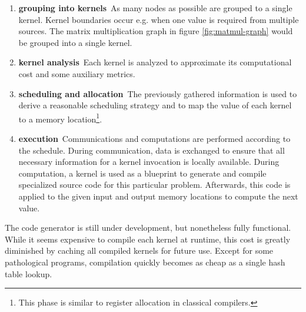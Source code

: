 \begin{enumerate}
\item \textbf{grouping into kernels}\, As many nodes as possible are
  grouped to a single kernel. Kernel boundaries occur e.g. when one value
  is required from multiple sources. The matrix multiplication graph in
  figure \ref{fig:matmul-graph} would be grouped into a single kernel.

\item \textbf{kernel analysis}\, Each kernel is analyzed to approximate its
  computational cost and some auxiliary metrics.

\item \textbf{scheduling and allocation}\, The previously gathered
  information is used to derive a reasonable scheduling strategy and to map
  the value of each kernel to a memory location\footnote{This phase is similar to
  register allocation in classical compilers.}.
\item \textbf{execution}\, Communications and computations are performed
  according to the schedule. During communication, data is exchanged to
  ensure that all necessary information for a kernel invocation is locally
  available. During computation, a kernel is used as a blueprint to
  generate and compile specialized source code for this particular
  problem. Afterwards, this code is applied to the given input and output
  memory locations to compute the next value.
\end{enumerate}

The code generator is still under development, but nonetheless fully
functional. While it seems expensive to compile each kernel at runtime,
this cost is greatly diminished by caching all compiled kernels for future
use. Except for some pathological programs, compilation quickly becomes as
cheap as a single hash table lookup.
